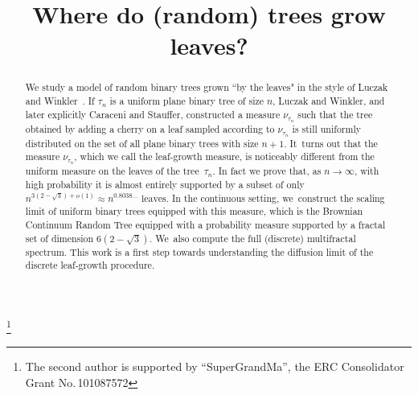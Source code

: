 \documentclass[JEP,XML,SOM,Unicode,NoFloatCountersInSection, NoEqCountersInSection,published]{cedram}
\theoremstyle{definition}
\begin{document}
\frontmatter
\title{Where do (random) trees grow leaves?}

\author[\initial{A.} \lastname{Caraceni}]{ }
\address{Scuola Normale Superiore di Pisa,\\
Piazza dei Cavalieri 7, 56121 Pisa, Italy}

\author[\initial{N.} \lastname{Curien}]{ }
\address{Université Paris-Saclay, Laboratoire de mathématiques d'Orsay,\\
Bât. 307, 91400 Orsay, France}

\author[\initial{R.} \lastname{Stephenson}]{\nobreakauthor {}}
\address{School of Mathematical and Physical Sciences, University of Sheffield,\\
Hicks Building, Sheffield S3 7RH, UK}

\thanks{The second author is supported by ``SuperGrandMa'', the ERC Consolidator Grant No.\,101087572}

\begin{abstract}
We study a model of random binary trees grown ``by the leaves" in the style of Luczak and Winkler~\cite{LW04}. If $\tau_n$ is a uniform plane binary tree of size $n$, Luczak and Winkler, and later explicitly Caraceni and Stauffer, constructed a measure $\nu_{\tau_n}$ such that the tree obtained by adding a cherry on a leaf sampled according to $\nu_{\tau_n}$ is still uniformly distributed on the set of all plane binary trees with size $n+1$. It~turns out that the measure $\nu_{\tau_n}$, which we call the leaf-growth measure, is noticeably different from the uniform measure on the leaves of the tree~$\tau_n$. In fact we prove that, as $n \to \infty$, with high probability it is almost entirely supported by a subset of only
$n^{3 (2 - \sqrt{3})+o(1)} \approx n^{0.8038...} \text{ leaves}$.
In the continuous setting, we~construct the scaling limit of uniform binary trees equipped with this measure, which is the Brownian Continuum Random Tree equipped with a probability measure supported by a fractal set of dimension $ 6 (2 - \sqrt{3})$. We~also compute the full (discrete) multifractal spectrum. This work is a first step towards understanding the diffusion limit of the discrete leaf-growth procedure.
\end{abstract}
\end{document}
